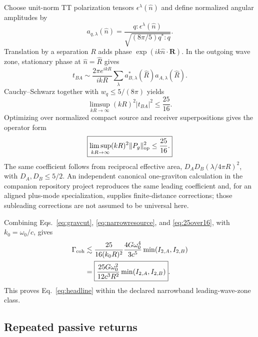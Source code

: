 Choose unit-norm TT polarization tensors $\epsilon^\lambda(\hat n)$ and define normalized angular amplitudes by
\begin{equation}
a_{q,\lambda}(\hat n)
=\frac{q:\epsilon^\lambda(\hat n)}
{\sqrt{(8\pi/5)q^*:q}}.
\end{equation}
Translation by a separation $R$ adds phase $\exp(ik\hat n\cdot\bm R)$. In the outgoing wave zone, stationary phase at $\hat n=\hat R$ gives
\begin{equation}
t_{BA}
\sim
\frac{2\pi e^{ikR}}{ikR}
\sum_\lambda a^*_{B,\lambda}(\hat R)a_{A,\lambda}(\hat R).
\end{equation}
Cauchy--Schwarz together with $w_q\le5/(8\pi)$ yields
\begin{equation}
\boxed{
\limsup_{kR\rightarrow\infty}
(kR)^2|t_{BA}|^2\le\frac{25}{16} .
}
\end{equation}
Optimizing over normalized compact source and receiver superpositions gives the operator form
\begin{equation}
\boxed{
\limsup_{kR\rightarrow\infty}
(kR)^2\|P_g\|_{\mathrm{op}}^2\le\frac{25}{16} .
}
\label{eq:25over16}
\end{equation}
The same coefficient follows from reciprocal effective area, $D_AD_B(\lambda/4\pi R)^2$, with $D_A,D_B\le5/2$. An independent canonical one-graviton calculation in the companion repository project reproduces the same leading coefficient and, for an aligned plus-mode specialization, supplies finite-distance corrections; those subleading corrections are not assumed to be universal here.

Combining Eqs.~\eqref{eq:gravcut}, \eqref{eq:narrowresource}, and \eqref{eq:25over16}, with $k_0=\omega_0/c$, gives
\begin{align}
\Gamma_{\rm coh}
&\lesssim
\frac{25}{16(k_0R)^2}
\frac{4G\omega_0^4}{3c^5}
\min(I_{2,A},I_{2,B}) \\
&=
\boxed{
\frac{25G\omega_0^2}{12c^3R^2}
\min(I_{2,A},I_{2,B})} .
\end{align}
This proves Eq.~\eqref{eq:headline} within the declared narrowband leading-wave-zone class.

\subsection{Repeated passive returns}

